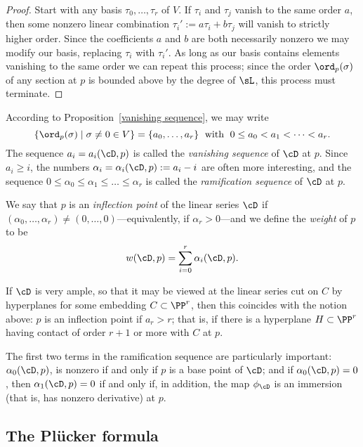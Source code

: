 \begin{proof} Start with any basis $\tau_0, \dots, \tau_r$ of $V$. If  $\tau_i$ and $\tau_j$ vanish to the same order $a$, then 
some nonzero linear combination $\tau_i' := a\tau_i+b\tau_j$  will vanish to strictly higher order. Since the coefficients $a$ and $b$ are both necessarily nonzero we may modify our basis, replacing $\tau_i$ with $\tau_i'$. As long as our basis contains elements vanishing to the same order we can repeat this process; since the order $\ord_p(\sigma)$ of any section at $p$ is bounded above by the degree of $\sL$, this process must terminate.
\end{proof}

According to  Proposition~\ref{vanishing sequence}, we may write
$$
\{ \ord_p(\sigma) \mid \sigma \neq 0 \in V \} = \{a_0,\dots,a_r\} \; \text{ with } \; 0\leq a_0 < a_1 < \dots < a_r.
$$
The sequence $a_i = a_i(\cD,p)$ is called the \emph{vanishing sequence} of $\cD$ at $p$.  Since $a_i \geq i$, the numbers $\alpha_i = \alpha_i(\cD,p) := a_i - i$ are often more interesting, and the sequence $0 \leq \alpha_0 \leq \alpha_1 \leq \dots \leq \alpha_r$ is called the \emph{ramification sequence} of $\cD$ at $p$. 

We say that $p$ is an \emph{inflection point} of the linear series $\cD$ if $(\alpha_0,\dots,\alpha_r) \neq (0,\dots,0)$---equivalently, if $\alpha_r > 0$---and we define the \emph{weight} of $p$ to be
$$
w(\cD, p) = \sum_{i=0}^r \alpha_i(\cD, p).
$$

If $\cD$ is very ample, so that it may be viewed at the linear series cut on $C$ by hyperplanes for some embedding $C \subset \PP^r$, then this coincides with the notion above: $p$ is an inflection point if $a_r > r$; that is, if there is a hyperplane $H \subset \PP^r$ having contact of order $r+1$ or more with $C$ at $p$.

The first two terms in the ramification sequence are particularly important: $\alpha_0(\cD, p)$, is nonzero if and only if $p$ is a base point of $\cD$; and if $\alpha_0(\cD, p)=0$, then $\alpha_1(\cD, p) = 0$ if and only if, in addition, the map $\phi_\cD$ is an immersion (that is, has nonzero derivative) at $p$.


\subsection{The Pl\"ucker formula}

